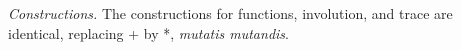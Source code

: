 \documentclass[preprint]{sigplanconf}
\newcommand{\lcal}{\ensuremath{\lambda}-calculus\xspace}
\begin{document}





\emph{Constructions.} The constructions for functions, involution, and trace are identical,
replacing {{+}} by {{*}}, \textit{mutatis mutandis}.

\end{document}
